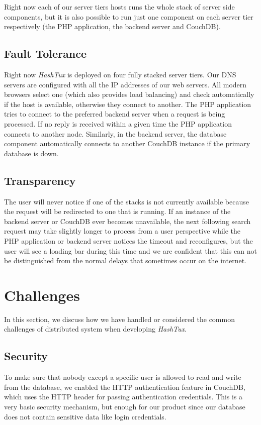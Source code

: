 Right now each of our server tiers hosts runs the whole stack of server side
components, but it is also possible to run just one component on each server
tier respectively (the PHP application, the backend server and CouchDB).

\subsection{Fault Tolerance}
Right now \textit{HashTux} is deployed on four fully stacked server tiers. Our
DNS servers are configured with all the IP addresses of our web servers. All
modern browsers select one (which also provides load balancing) and check
automatically if the host is available, otherwise they connect to another. The
PHP application tries to connect to the preferred backend server when a
request is being processed. If no reply is received within a given time the PHP
application connects to another node. Similarly, in the backend server, the
database component automatically connects to another CouchDB instance if the
primary database is down.

\subsection{Transparency}
The user will never notice if one of the stacks is not currently available
because the request will be redirected to one that is running. If an instance of
the backend server or CouchDB ever becomes unavailable, the next following
search request may take slightly longer to process from a user perspective while
the PHP application or backend server notices the timeout and reconfigures,
but the user will see a loading bar during this time and we are confident that
this can not be distinguished from the normal delays that sometimes occur on the
internet.

\section{Challenges}
In this section, we discuss how we have handled or considered the common
challenges of distributed system when developing \textit{HashTux}.

\subsection{Security}
To make sure that nobody except a specific user is allowed to read and write
from the database, we enabled the HTTP authentication feature in CouchDB, which
uses the HTTP header for passing authentication credentials. This is a very
basic security mechanism, but enough for our product since our database does not
contain sensitive data like login credentials. \\

